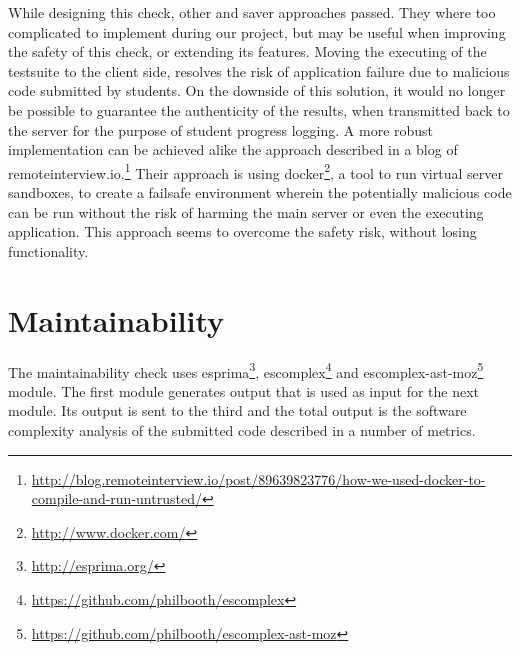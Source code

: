 While designing this \gls{check}, other and saver approaches passed. They where
too complicated to implement during our project, but may be useful when improving
the safety of this check, or extending its features. Moving the executing of the
testsuite to the client side, resolves the risk of application failure due to
malicious code submitted by \glspl{student}. On the downside of this solution, it would
no longer be possible to guarantee the authenticity of the results, when
transmitted back to the server for the purpose of student progress logging. 
A more robust implementation can be achieved alike the approach described in a
blog of remoteinterview.io.\footnote{\url{http://blog.remoteinterview.io/post/89639823776/how-we-used-docker-to-compile-and-run-untrusted/}}
Their approach is using docker\footnote{\url{http://www.docker.com/}}, a tool to
run virtual server sandboxes, to create a failsafe environment wherein the 
potentially malicious code can be run without the risk of harming the main server or
even the executing application. This approach seems to overcome the safety risk,
without losing functionality. 

\section{Maintainability}

The maintainability \gls{check} uses esprima\footnote{\url{http://esprima.org/}},
escomplex\footnote{\url{https://github.com/philbooth/escomplex}} and
escomplex-ast-moz\footnote{\url{https://github.com/philbooth/escomplex-ast-moz}} module.
The first module generates output that is used as input for the next module.
Its output is sent to the third and the total output is the software
complexity analysis of the submitted code described in a number of metrics.

